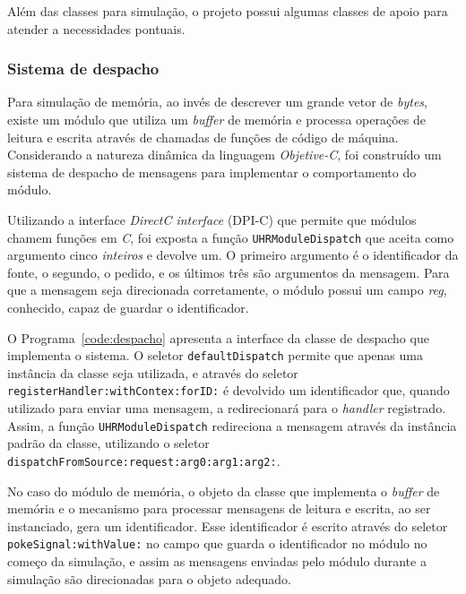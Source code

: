 Além das classes para simulação, o projeto possui algumas classes de apoio para atender a necessidades pontuais.

\subsubsection{Sistema de despacho}
\label{ssec:disp}

Para simulação de memória, ao invés de descrever um grande vetor de \emph{bytes}, existe um módulo que utiliza
um \emph{buffer} de memória e processa operações de leitura e escrita através de chamadas de funções de código de máquina.
Considerando a natureza dinâmica da linguagem \emph{Objetive-C}, foi construído um sistema de despacho de mensagens
para implementar o comportamento do módulo.

Utilizando a interface \emph{DirectC interface} (DPI-C) \citep{dpic} que permite que módulos chamem funções em \emph{C},
foi exposta a função \texttt{UHRModuleDispatch} que aceita como argumento cinco \emph{inteiros} e devolve um.
O primeiro argumento é o identificador da fonte, o segundo, o pedido, e os últimos três são argumentos da mensagem.
Para que a mensagem seja direcionada corretamente, o módulo possui um campo \emph{reg}, conhecido, capaz de guardar o identificador.

O Programa~\ref{code:despacho} apresenta a interface da classe de despacho que implementa o sistema.
O seletor \texttt{defaultDispatch} permite
que apenas uma instância da classe seja utilizada, e através do seletor \texttt{registerHandler:withContex:forID:} é devolvido
um identificador que, quando utilizado para enviar uma mensagem, a redirecionará para o \emph{handler} registrado.
Assim, a função \texttt{UHRModuleDispatch} redireciona a mensagem através da instância padrão da classe, utilizando o seletor
\texttt{dispatchFromSource:request:arg0:arg1:arg2:}.

No caso do módulo de memória, o objeto da classe que implementa o \emph{buffer} de memória e o mecanismo para processar mensagens de 
leitura e escrita, ao ser instanciado, gera um identificador. Esse identificador é escrito através do seletor \texttt{pokeSignal:withValue:}
no campo que guarda o identificador no módulo no começo da simulação, e assim as mensagens enviadas pelo módulo durante a simulação
são direcionadas para o objeto adequado.

